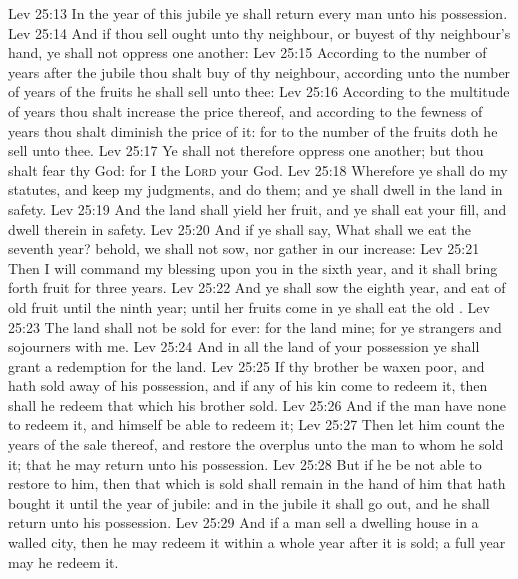 \vs Lev 25:13 In the year of this jubile ye shall return every man unto his possession.
\vs Lev 25:14 And if thou sell ought unto thy neighbour, or buyest  of thy neighbour's hand, ye shall not oppress one another:
\vs Lev 25:15 According to the number of years after the jubile thou shalt buy of thy neighbour,  according unto the number of years of the fruits he shall sell unto thee:
\vs Lev 25:16 According to the multitude of years thou shalt increase the price thereof, and according to the fewness of years thou shalt diminish the price of it: for  to the number  of the fruits doth he sell unto thee.
\vs Lev 25:17 Ye shall not therefore oppress one another; but thou shalt fear thy God: for I  the \textsc{Lord} your God.
\vs Lev 25:18 Wherefore ye shall do my statutes, and keep my judgments, and do them; and ye shall dwell in the land in safety.
\vs Lev 25:19 And the land shall yield her fruit, and ye shall eat your fill, and dwell therein in safety.
\vs Lev 25:20 And if ye shall say, What shall we eat the seventh year? behold, we shall not sow, nor gather in our increase:
\vs Lev 25:21 Then I will command my blessing upon you in the sixth year, and it shall bring forth fruit for three years.
\vs Lev 25:22 And ye shall sow the eighth year, and eat  of old fruit until the ninth year; until her fruits come in ye shall eat  the old .
\vs Lev 25:23 The land shall not be sold for ever: for the land  mine; for ye  strangers and sojourners with me.
\vs Lev 25:24 And in all the land of your possession ye shall grant a redemption for the land.
\vs Lev 25:25 If thy brother be waxen poor, and hath sold away  of his possession, and if any of his kin come to redeem it, then shall he redeem that which his brother sold.
\vs Lev 25:26 And if the man have none to redeem it, and himself be able to redeem it;
\vs Lev 25:27 Then let him count the years of the sale thereof, and restore the overplus unto the man to whom he sold it; that he may return unto his possession.
\vs Lev 25:28 But if he be not able to restore  to him, then that which is sold shall remain in the hand of him that hath bought it until the year of jubile: and in the jubile it shall go out, and he shall return unto his possession.
\vs Lev 25:29 And if a man sell a dwelling house in a walled city, then he may redeem it within a whole year after it is sold;  a full year may he redeem it.
